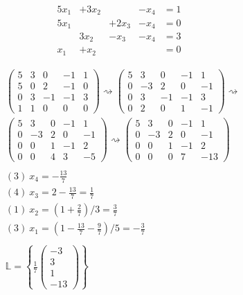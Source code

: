 \documentclass[12pt,answers]{exam}
\begin{document}
\begin{questions}
\[\begin{array}{rrrrl}
	5 x_1 &+ 3 x_2 &~      &-x_4 &=1 \\
	5 x_1 &~       &+2 x_3 &-x_4 &=0 \\
	~     &3 x_2   &-x_3   &-x_4 &=3 \\
	x_1   &+ x_2   &~      &~    &=0
\end{array}\]
\begin{solution}
\begin{align*}
&
\left(\begin{array}{rrrr|r}
5 & 3 & 0 & -1 & 1\\
5 & 0 & 2 & -1 & 0\\
0 & 3 & -1 & -1 & 3\\
1 & 1 & 0 & 0 & 0
\end{array} \right)
\rightsquigarrow
\left(\begin{array}{rrrr|r}
5 & 3 & 0 & -1 & 1\\
0 & -3 & 2 & 0 & -1\\
0 & 3 & -1 & -1 & 3\\
0 & 2 & 0 & 1 & -1
\end{array} \right)
\rightsquigarrow
\\
&
\left(\begin{array}{rrrr|r}
5 & 3 & 0 & -1 & 1\\
0 & -3 & 2 & 0 & -1\\
0 & 0 & 1 & -1 & 2\\
0 & 0 & 4 & 3 & -5
\end{array} \right)
\rightsquigarrow
\left(\begin{array}{rrrr|r}
5 & 3 & 0 & -1 & 1\\
0 & -3 & 2 & 0 & -1\\
0 & 0 & 1 & -1 & 2\\
0 & 0 & 0 & 7 & -13
\end{array} \right)
\\ \\
&(3)\ x_4=-\tfrac{13}{7}
\\
&(4)\ x_3=2-\tfrac{13}{7}=\tfrac{1}{7}
\\
&(1)\ x_2=(1+\tfrac{2}{7})/3=\tfrac{3}{7}
\\
&(3)\ x_1=\left(1-\tfrac{13}{7}-\tfrac{9}{7}\right)/5=-\tfrac{3}{7}
\\ \\
& \mathbb{L}=\left\{ \frac{1}{7}\begin{pmatrix}-3\\3\\1\\-13\end{pmatrix} \right\}
\end{align*}
\end{solution}
\pagebreak
{}


\end{questions}
\end{document}
